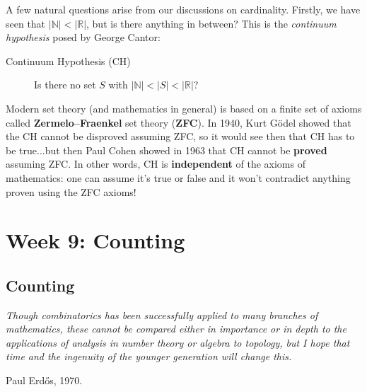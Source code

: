 \documentclass[11pt,dvipsnames]{book}
\def\R{\mathbb{R}}
\def\N{{\mathbb{N}}}
\numberwithin{figure}{section} %
\numberwithin{table}{section} %
\begin{document}
A few natural questions arise from our discussions on cardinality. Firstly, we have seen that $|\N|<|\R|$, but is there anything in between? This is the {\it continuum hypothesis} posed by George Cantor:\\

\begin{description}
\item[Continuum Hypothesis (CH)] Is there no set $S$ with $|\mathbb{N}|<|S|<|\mathbb{R}|$?\\
\end{description}

Modern set theory (and mathematics in general) is based on a finite set of axioms called {\bf Zermelo--Fraenkel} set theory ({\bf ZFC}). In 1940, Kurt G\"odel showed that the CH cannot be disproved assuming ZFC, so it would see then that CH has to be true...but then Paul Cohen showed in 1963 that CH cannot be {\bf proved} assuming ZFC. In other words, CH is {\bf independent} of the axioms of mathematics: one can assume it's true or false and it won't contradict anything proven using the ZFC axioms!

%


\part{Week 9: Counting}


\chapter{Counting}%
\label{counting}

\epigraph{\it    Though combinatorics has been successfully applied to many branches of mathematics, these cannot be compared either in importance or in depth to the applications of analysis in number theory or algebra to topology, but I hope that time and the ingenuity of the younger generation will change this.
}{Paul Erd\H{o}s, 1970.}
\end{document}
